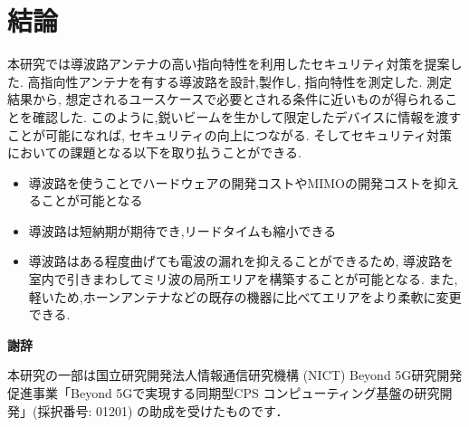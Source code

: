 \documentclass[technicalreport]{ieicej}
\begin{document}
\section{結論}

本研究では導波路アンテナの高い指向特性を利用したセキュリティ対策を提案した.
高指向性アンテナを有する導波路を設計,製作し,
指向特性を測定した.
測定結果から,
想定されるユースケースで必要とされる条件に近いものが得られることを確認した.
このように,鋭いビームを生かして限定したデバイスに情報を渡すことが可能になれば,
セキュリティの向上につながる.
そしてセキュリティ対策においての課題となる以下を取り払うことができる.

\begin{itemize}
  \item 導波路を使うことでハードウェアの開発コストやMIMOの開発コストを抑えることが可能となる
  \item 導波路は短納期が期待でき,リードタイムも縮小できる
  \item 導波路はある程度曲げても電波の漏れを抑えることができるため,
  導波路を室内で引きまわしてミリ波の局所エリアを構築することが可能となる.
  また,軽いため,ホーンアンテナなどの既存の機器に比べてエリアをより柔軟に変更できる.
\end{itemize}

\begin{center}
  \Large \textbf{謝辞}
\end{center}

本研究の一部は国立研究開発法人情報通信研究機構 (NICT) 
Beyond 5G研究開発促進事業「Beyond 5Gで実現する同期型CPS
コンピューティング基盤の研究開発」(採択番号: 01201) の助成を受けたものです．

%
%

\end{document}
